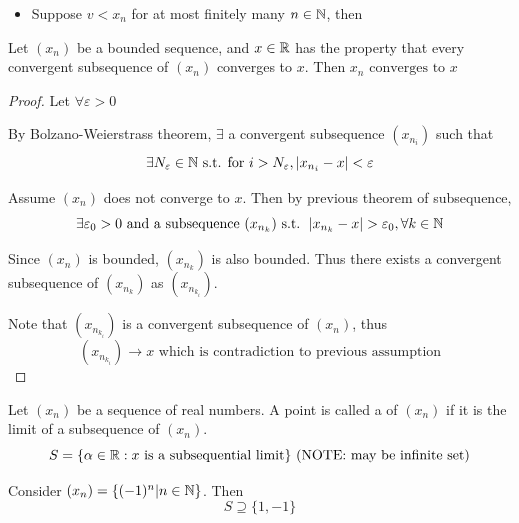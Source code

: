 \documentclass[a4paper,12pt]{article}
\begin{document}

\begin{itemize}
    \item Suppose \(v<x_n\) for at most finitely many \(n\in\mathbb{N}\), then \\
\end{itemize}


\begin{theorem}
    Let \((x_n)\) be a bounded sequence, and \(x\in\mathbb{R}\) has the property that every convergent subsequence of \((x_n)\) converges to \(x\). 
    Then \(x_n \text{ converges to } x\)
    \begin{proof}
        Let \(\forall\varepsilon>0\)

        By Bolzano-Weierstrass theorem, \(\exists\) a convergent subsequence \((x_{n_i})\) such that
        \[\exists N_\varepsilon\in\mathbb{N} \text{ s.t. for } i>N_\varepsilon, \left\lvert x_{n_i}-x\right\rvert<\varepsilon\]
        
        Assume \((x_n)\) does not converge to \(x\). Then by previous theorem of subsequence,
        \[\exists \varepsilon_0 >0 \text{ and a subsequence }(x_{n_k}) \text{ s.t. }\left\lvert x_{n_k}-x\right\rvert>\varepsilon_0, \forall k\in\mathbb{N}\]
        
        Since \((x_n)\) is bounded, \((x_{n_k})\) is also bounded. Thus there exists a convergent subsequence of \((x_{n_k})\) as \((x_{n_{k_i}})\).

        Note that \((x_{n_{k_i}})\) is a convergent subsequence of \((x_n)\), thus 
        \[(x_{n_{k_i}})\rightarrow x\text{ which is contradiction to previous assumption}\]
    \end{proof}
\end{theorem}
\begin{definition}
    Let \((x_n)\) be a sequence of real numbers. A point is called a  of \((x_n)\) if it is the limit of a subsequence of \((x_n)\).
    \[S = \{\alpha \in\mathbb{R}:x\text{ is a subsequential limit}\}\text{ (NOTE: may be infinite set)}\]
    \begin{example}
        Consider \((x_{n})=\{(-1)^n|n\in\mathbb{N}\}\). Then 
        \[S \supseteq \{1,-1\}\]
    \end{example}

\end{definition}
\end{document}
